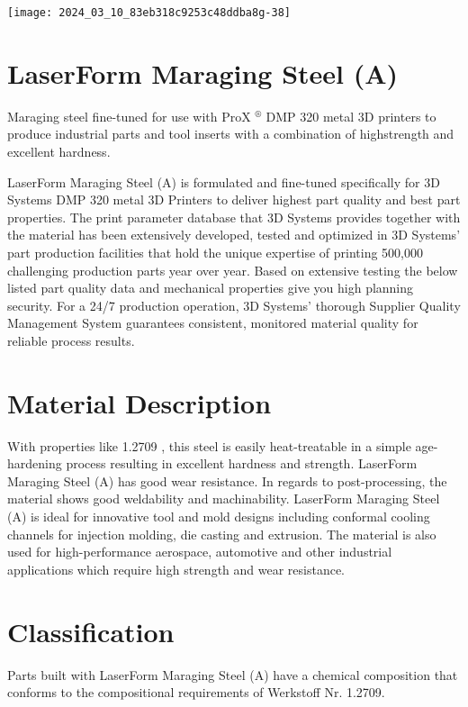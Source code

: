 \documentclass[10pt]{article}
\begin{document}
\begin{center}
\texttt{[image: 2024\_03\_10\_83eb318c9253c48ddba8g-38]}
\end{center}

\section*{LaserForm Maraging Steel (A)}
Maraging steel fine-tuned for use with ProX ${ }^{\circledR}$ DMP 320 metal 3D printers to produce industrial parts and tool inserts with a combination of highstrength and excellent hardness.

LaserForm Maraging Steel (A) is formulated and fine-tuned specifically for 3D Systems DMP 320 metal 3D Printers to deliver highest part quality and best part properties. The print parameter database that 3D Systems provides together with the material has been extensively developed, tested and optimized in 3D Systems' part production facilities that hold the unique expertise of printing 500,000 challenging production parts year over year. Based on extensive testing the below listed part quality data and mechanical properties give you high planning security. For a 24/7 production operation, 3D Systems' thorough Supplier Quality Management System guarantees consistent, monitored material quality for reliable process results.

\section*{Material Description}
With properties like 1.2709 , this steel is easily heat-treatable in a simple age-hardening process resulting in excellent hardness and strength. LaserForm Maraging Steel (A) has good wear resistance. In regards to post-processing, the material shows good weldability and machinability. LaserForm Maraging Steel (A) is ideal for innovative tool and mold designs including conformal cooling channels for injection molding, die casting and extrusion. The material is also used for high-performance aerospace, automotive and other industrial applications which require high strength and wear resistance.

\section*{Classification}
Parts built with LaserForm Maraging Steel (A) have a chemical composition that conforms to the compositional requirements of Werkstoff Nr. 1.2709.
\end{document}
